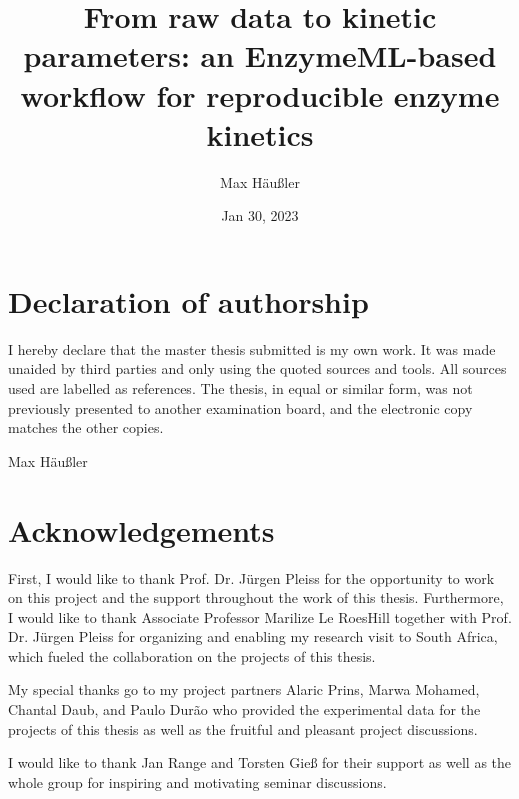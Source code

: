 \documentclass[letterpaper,12pt,english]{jupyterBook}
\title{From raw data to kinetic parameters: an EnzymeML-based workflow for reproducible enzyme kinetics}
\date{Jan 30, 2023}
\author{Max Häußler}
\begin{document}
\pagestyle{empty}
\sphinxmaketitle
\pagestyle{plain}
\sphinxtableofcontents
\pagestyle{normal}



\sphinxstepscope


\chapter{Declaration of authorship}
\label{\detokenize{declaration:declaration-of-authorship}}\label{\detokenize{declaration::doc}}
\sphinxAtStartPar
I hereby declare that the master thesis submitted is my own work. It was made unaided by third parties and only using the quoted sources and tools. All sources used are labelled as references. The thesis, in equal or similar form, was not previously presented to another examination board, and the electronic copy matches the other copies.

\sphinxAtStartPar
Max Häußler

\sphinxstepscope


\chapter{Acknowledgements}
\label{\detokenize{acknowledgements:acknowledgements}}\label{\detokenize{acknowledgements::doc}}
\sphinxAtStartPar
First, I would like to thank Prof. Dr. Jürgen Pleiss for the opportunity to work on this project and the support throughout the work of this thesis.
Furthermore, I would like to thank Associate Professor Marilize Le Roes\sphinxhyphen{}Hill together with Prof. Dr. Jürgen Pleiss for organizing and enabling my research visit to South Africa, which fueled the collaboration on the projects of this thesis.

\sphinxAtStartPar
My special thanks go to my project partners Alaric Prins, Marwa Mohamed, Chantal Daub, and Paulo Durão who provided the experimental data for the projects of this thesis as well as the fruitful and pleasant project discussions.

\sphinxAtStartPar
I would like to thank Jan Range and Torsten Gieß for their support as well as the whole group for inspiring and motivating seminar discussions.

\sphinxstepscope
\end{document}
